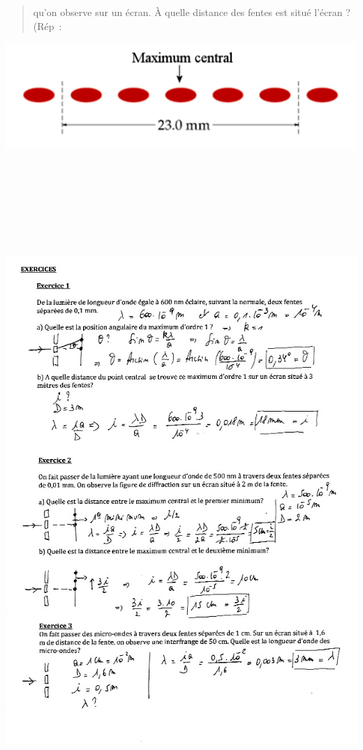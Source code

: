 \begin{quote}
qu'on observe sur un écran. À quelle distance des fentes est situé
l'écran\textbf{ }? (Rép~:
\end{quote}

\includegraphics[width=13.259cm,height=4.045cm]{Pictures/100000010000059F000001B75001F99348A6D888.png}

\includegraphics[width=18.503cm,height=25.663cm]{Pictures/100000010000026E0000035F0050AD553CE14CB4.png}

